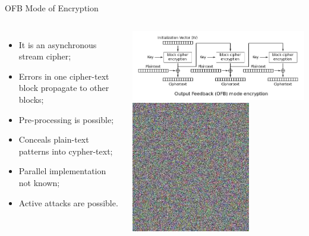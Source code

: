 \documentclass[12pt]{beamer}
\begin{document}
\begin{frame}{OFB Mode of Encryption}
\begin{columns}
\begin{itemize}
\item It is an asynchronous stream cipher;\pause
\item Errors in one cipher-text block propagate to other blocks;\pause
\item Pre-processing is possible;\pause
\item Conceals plain-text patterns into cypher-text;\pause
\item Parallel implementation not known;\pause
\item Active attacks are possible.\pause
\end{itemize}
\begin{center}
\includegraphics[scale=.25]{OFB_encryption.png}\pause\\
\includegraphics[scale=.35]{Tux_secure.jpg}
\end{center}
\end{columns}
\end{frame}
\end{document}
